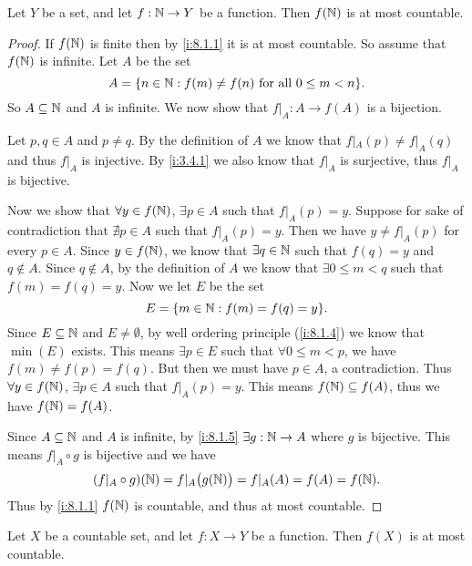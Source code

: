 \begin{prop}\label{i:8.1.8}
  Let \(Y\) be a set, and let \(f : \mathbb{N} \to Y\) be a function.
  Then \(f(\mathbb{N})\) is at most countable.
\end{prop}

\begin{proof}
  If \(f(\mathbb{N})\) is finite then by \cref{i:8.1.1} it is at most countable.
  So assume that \(f(\mathbb{N})\) is infinite.
  Let \(A\) be the set
  \[
    A = \set{n \in \N : f(m) \neq f(n) \text{ for all } 0 \leq m < n}.
  \]
  So \(A \subseteq \mathbb{N}\) and \(A\) is infinite.
  We now show that \(f|_A : A \to f(A)\) is a bijection.

  Let \(p, q \in A\) and \(p \neq q\).
  By the definition of \(A\) we know that \(f|_A(p) \neq f|_A(q)\) and thus \(f|_A\) is injective.
  By \cref{i:3.4.1} we also know that \(f|_A\) is surjective, thus \(f|_A\) is bijective.

  Now we show that \(\forall y \in f(\mathbb{N})\), \(\exists p \in A\) such that \(f|_A(p) = y\).
  Suppose for sake of contradiction that \(\nexists p \in A\) such that \(f|_A(p) = y\).
  Then we have \(y \neq f|_A(p)\) for every \(p \in A\).
  Since \(y \in f(\mathbb{N})\), we know that \(\exists q \in \mathbb{N}\) such that \(f(q) = y\) and \(q \notin A\).
  Since \(q \notin A\), by the definition of \(A\) we know that \(\exists 0 \leq m < q\) such that \(f(m) = f(q) = y\).
  Now we let \(E\) be the set
  \[
    E = \set{m \in \N : f(m) = f(q) = y}.
  \]
  Since \(E \subseteq \mathbb{N}\) and \(E \neq \emptyset\), by well ordering principle (\cref{i:8.1.4}) we know that \(\min(E)\) exists.
  This means \(\exists p \in E\) such that \(\forall 0 \leq m < p\), we have \(f(m) \neq f(p) = f(q)\).
  But then we must have \(p \in A\), a contradiction.
  Thus \(\forall y \in f(\mathbb{N})\), \(\exists p \in A\) such that \(f|_A(p) = y\).
  This means \(f(\mathbb{N}) \subseteq f(A)\), thus we have \(f(\mathbb{N}) = f(A)\).

  Since \(A \subseteq \mathbb{N}\) and \(A\) is infinite, by \cref{i:8.1.5} \(\exists g : \mathbb{N} \to A\) where \(g\) is bijective.
  This means \(f|_A \circ g\) is bijective and we have
  \[
    (f|_A \circ g)(\mathbb{N}) = f|_A\big(g(\mathbb{N})\big) = f|_A(A) = f(A) = f(\mathbb{N}).
  \]
  Thus by \cref{i:8.1.1} \(f(\mathbb{N})\) is countable, and thus at most countable.
\end{proof}

\begin{cor}\label{i:8.1.9}
  Let \(X\) be a countable set, and let \(f : X \to Y\) be a function.
  Then \(f(X)\) is at most countable.
\end{cor}

